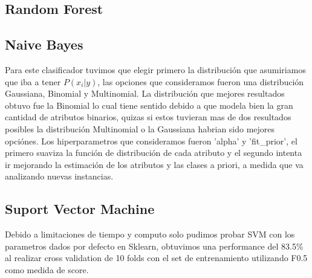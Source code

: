 \begin{enumerate}
\subsection{Random Forest}


\subsection{Naive Bayes}

Para este clasificador tuvimos que elegir primero la distribución que asumiriamos que iba a tener $ P(x_i | y) $, las opciones que consideramos fueron una distribución Gaussiana, Binomial y Multinomial. La distribución que mejores resultados obtuvo fue la Binomial lo cual tiene sentido debido a que modela bien la gran cantidad de atributos binarios, quizas si estos tuvieran mas de dos resultados posibles la distribución Multinomial o la Gaussiana habrian sido mejores opciónes.
Los hiperparametros que consideramos fueron 'alpha' y 'fit_prior', el primero suaviza la función de distribución de cada atributo y el segundo intenta ir mejorando la estimación de los atributos y las clases a priori, a medida que va analizando nuevas instancias.


\subsection{Suport Vector Machine}

Debido a limitaciones de tiempo y computo solo pudimos probar SVM con los parametros dados por defecto en Sklearn, obtuvimos una performance del 83.5\% al realizar cross validation de 10 folds con el set de entrenamiento utilizando F0.5 como medida de score.

\end{enumerate}
